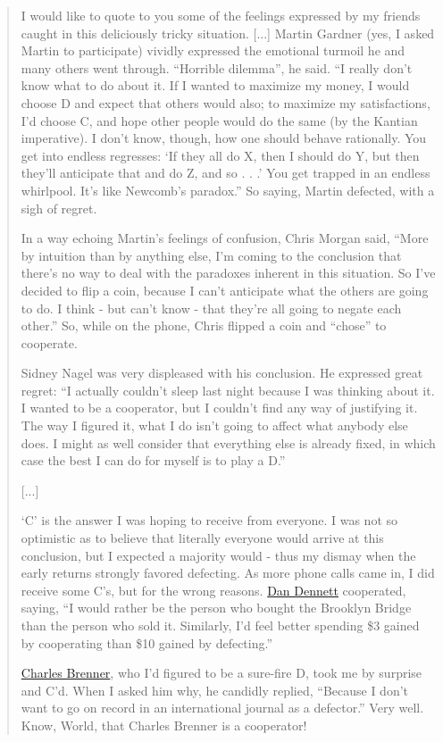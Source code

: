 \begin{quote}
I would like to quote to you some of the feelings expressed by my
friends caught in this deliciously tricky situation. {[}...{]} Martin
Gardner (yes, I asked Martin to participate) vividly expressed the
emotional turmoil he and many others went through. ``Horrible dilemma'',
he said. ``I really don't know what to do about it. If I wanted to
maximize my money, I would choose D and expect that others would also;
to maximize my satisfactions, I'd choose C, and hope other people would
do the same (by the Kantian imperative). I don't know, though, how one
should behave rationally. You get into endless regresses: `If they all
do X, then I should do Y, but then they'll anticipate that and do Z, and
so . . .' You get trapped in an endless whirlpool. It's like Newcomb's
paradox.'' So saying, Martin defected, with a sigh of regret.

In a way echoing Martin's feelings of confusion, Chris Morgan said,
``More by intuition than by anything else, I'm coming to the conclusion
that there's no way to deal with the paradoxes inherent in this
situation. So I've decided to flip a coin, because I can't anticipate
what the others are going to do. I think - but can't know - that they're
all going to negate each other.'' So, while on the phone, Chris flipped
a coin and ``chose'' to cooperate.

Sidney Nagel was very displeased with his conclusion. He expressed great
regret: ``I actually couldn't sleep last night because I was thinking
about it. I wanted to be a cooperator, but I couldn't find any way of
justifying it. The way I figured it, what I do isn't going to affect
what anybody else does. I might as well consider that everything else is
already fixed, in which case the best I can do for myself is to play a
D.''

{[}...{]}

`C' is the answer I was hoping to receive from everyone. I was not so
optimistic as to believe that literally everyone would arrive at this
conclusion, but I expected a majority would - thus my dismay when the
early returns strongly favored defecting. As more phone calls came in, I
did receive some C's, but for the wrong reasons.
\href{http://en.wikipedia.org/wiki/Dan\%20Dennett}{Dan Dennett}
cooperated, saying, ``I would rather be the person who bought the
Brooklyn Bridge than the person who sold it. Similarly, I'd feel better
spending \$3 gained by cooperating than \$10 gained by defecting.''

\href{http://en.wikipedia.org/wiki/Charles\%20Brenner}{Charles
Brenner}, who I'd figured to be a sure-fire D, took me by surprise and
C'd. When I asked him why, he candidly replied, ``Because I don't want
to go on record in an international journal as a defector.'' Very well.
Know, World, that Charles Brenner is a cooperator!


\end{quote}
